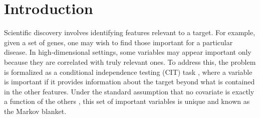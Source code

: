 \documentclass{article}
\theoremstyle{plain}
\theoremstyle{definition}
\theoremstyle{remark}
\begin{document}
\section{Introduction}
Scientific discovery involves identifying features relevant to a target. For example, given a set of genes, one may wish to find those important for a particular disease. In high-dimensional settings, some variables may appear important only because they are correlated with truly relevant ones. To address this, the problem is formalized as a conditional independence testing (CIT) task \cite{candes2018panning}, where a variable is important if it provides information about the target beyond what is contained in the other features. Under the standard assumption that no covariate is exactly a function of the others \cite{candes2018panning, LocoVSShapley}, this set of important variables is unique and known as the Markov blanket.



\end{document}
